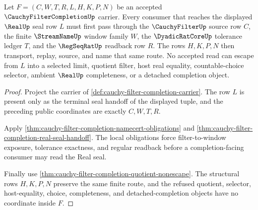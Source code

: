 \begin{theorem}
\label{thm:cauchy-filter-completion-real-seal-nonescape}
Let $F=(C,W,T,R,L,H,K,P,N)$ be an accepted $\CauchyFilterCompletionUp$ carrier. Every consumer that reaches the displayed $\RealUp$ seal row $L$ must first pass through the $\CauchyFilterUp$ source row $C$, the finite $\StreamNameUp$ window family $W$, the $\DyadicRatCoreUp$ tolerance ledger $T$, and the $\RegSeqRatUp$ readback row $R$. The rows $H,K,P,N$ then transport, replay, source, and name that same route. No accepted read can escape from $L$ into a selected limit, quotient filter, host real equality, countable-choice selector, ambient $\RealUp$ completeness, or a detached completion object.
\end{theorem}
\begin{proof}
Project the carrier of \autoref{def:cauchy-filter-completion-carrier}. The row $L$ is present only as the terminal seal handoff of the displayed tuple, and the preceding public coordinates are exactly $C,W,T,R$.

Apply \autoref{thm:cauchy-filter-completion-namecert-obligations} and \autoref{thm:cauchy-filter-completion-real-seal-handoff}. The local obligations force filter-to-window exposure, tolerance exactness, and regular readback before a completion-facing consumer may read the Real seal.

Finally use \autoref{thm:cauchy-filter-completion-quotient-nonescape}. The structural rows $H,K,P,N$ preserve the same finite route, and the refused quotient, selector, host-equality, choice, completeness, and detached-completion objects have no coordinate inside $F$.
\end{proof}


